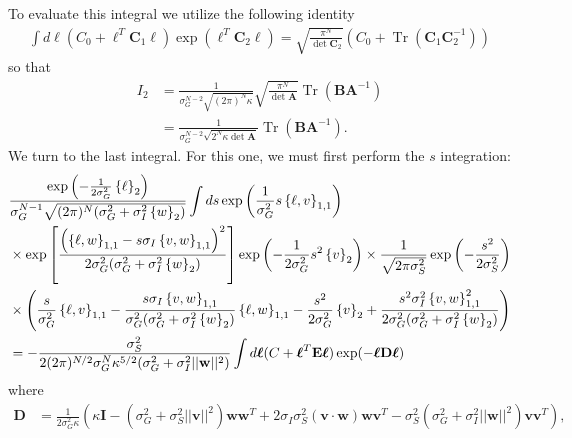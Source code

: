 \documentclass[11pt]{article}
\DeclareMathOperator{\Tr}{Tr}
\begin{document}
To evaluate this integral we utilize the following identity
\begin{align}
\int d\boldsymbol{\ell} \left(C_0 +\boldsymbol{\ell}^T \mathbf{C}_1 \boldsymbol{\ell}\right)\exp\left(\boldsymbol{\ell}^T \mathbf{C}_2 \boldsymbol{\ell}\right) = \sqrt{\frac{\pi^N}{\det \mathbf{C}_2}}\left(C_0 + \Tr\left(\mathbf{C}_1\mathbf{C}_2^{-1}\right)\right)
\end{align}
so that
\begin{align}
	I_2 &= \frac{1}{\sigma_G^{N-2}\sqrt{(2\pi)^N \kappa}} \sqrt{\frac{\pi^N}{\det \mathbf{A}}} \Tr(\mathbf{B} \mathbf{A}^{-1}) \\
	&= \frac{1}{\sigma_G^{N-2} \sqrt{2^N \kappa \det \mathbf{A}}}\Tr(\mathbf{B} \mathbf{A}^{-1}).
\end{align}
We turn to the last integral. For this one, we must first perform the $s$ integration: 
\begin{align}
	&\frac{\exp\left(-\frac{1}{2\sigma_G^2}\left\{\ell \right\}_2\right)}{\sigma_G^{N-1}\sqrt{(2\pi)^N(\sigma_G^2 + \sigma_I^2 \left\{w\right\}_2)}} \int ds \exp\left(\frac{1}{\sigma_G^2} s\left\{\ell, v\right\}_{1,1}\right) \notag \\
	&\times \exp\left[\frac{\left(\left\{\ell, w\right\}_{1,1} - s \sigma_I \left\{v,w\right\}_{1,1}\right)^2}{2\sigma_G^2 (\sigma_G^2 + \sigma_I^2 \left\{w\right\}_2)}\right]\exp\left(-\frac{1}{2\sigma_G^2}s^2 \left\{v\right\}_2\right)\times \frac{1}{\sqrt{2\pi \sigma_S^2}} \exp\left(-\frac{s^2}{2\sigma_S^2}\right) \notag \\
	&\times \left(\frac{s}{\sigma_G^2} \left\{\ell, v\right\}_{1,1} - \frac{s \sigma_I \left\{v,w\right\}_{1,1}}{\sigma_G^2 (\sigma_G^2 + \sigma_I^2 \left\{w\right\}_2)}\left\{\ell, w\right\}_{1,1} - \frac{s^2}{2\sigma_G^2} \left\{v\right\}_2   + \frac{s^2 \sigma_I^2 \left\{v,w\right\}_{1,1}^2}{2\sigma_G^2 (\sigma_G^2 + \sigma_I^2 \left\{w\right\}_2)}\right) \\
	&= -\frac{\sigma_S^2}{2(2\pi)^{N/2} \sigma_G^N \kappa^{5/2} (\sigma_G^2 + \sigma_I^2 ||\mathbf{w}||^2)}\int d\boldsymbol{\ell}(C + \boldsymbol{\ell}^T \mathbf{E} \boldsymbol{\ell})\exp(-\boldsymbol{\ell} \mathbf{D} \boldsymbol{\ell})
\end{align}
where
\begin{align}
\mathbf{D} &= \frac{1}{2\sigma_G^2 \kappa}\left(\kappa \mathbf{I} - (\sigma_G^2 + \sigma_S^2 ||\mathbf{v}||^2) \mathbf{ww}^T + 2 \sigma_I \sigma_S^2 (\mathbf{v}\cdot \mathbf{w}) \mathbf{wv}^T - \sigma_S^2 (\sigma_G^2 + \sigma_I^2 ||\mathbf{w}||^2)\mathbf{vv}^T\right),
\end{align}
\end{document}
